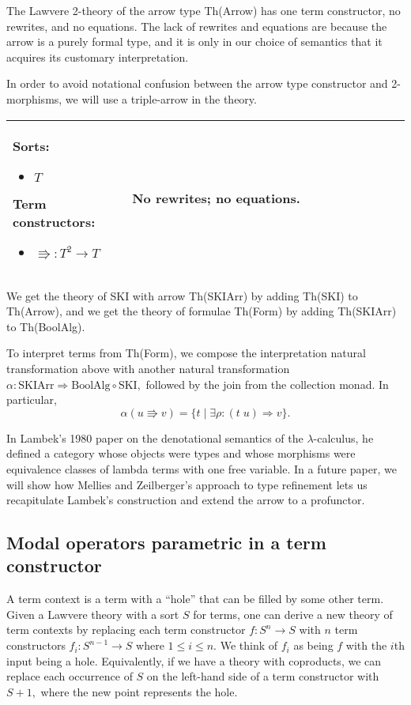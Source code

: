 \documentclass{llncs}
\newcommand{\maps}{\colon}
\begin{document}
The Lawvere 2-theory of the arrow type Th(Arrow) has one term constructor, no rewrites, and no equations.  The lack of rewrites and equations are because the arrow is a purely formal type, and it is only in our choice of semantics that it acquires its customary interpretation.

In order to avoid notational confusion between the arrow type constructor and 2-morphisms, we will use a triple-arrow in the theory.
\begin{center}
  \begin{longtable}{|p{0.3\linewidth}|p{0.7\linewidth}|}
    \hline
    Sorts:
    \begin{itemize}
      \item $T$
    \end{itemize}
    Term constructors:
    \begin{itemize}
      \item $\Rrightarrow \maps T^2 \to T$
    \end{itemize}
    &
    No rewrites; no equations.\\
    \hline
  \end{longtable}
\end{center}

We get the theory of SKI with arrow Th(SKIArr) by adding Th(SKI) to Th(Arrow), and we get the theory of formulae Th(Form) by adding Th(SKIArr) to Th(BoolAlg).

To interpret terms from Th(Form), we compose the interpretation natural transformation above with another natural transformation $\alpha\maps \mathrm{SKIArr} \Rightarrow \mathrm{BoolAlg} \circ \mathrm{SKI},$ followed by the join from the collection monad.  In particular, 
\[ \alpha(u \Rrightarrow v) = \{ t \;|\; \exists \rho\maps (t\; u) \Rightarrow v \}. \]

In Lambek's 1980 paper \cite{Lambek} on the denotational semantics of the $\lambda$-calculus, he defined a category whose objects were types and whose morphisms were equivalence classes of lambda terms with one free variable.  In a future paper, we will show how Mellies and Zeilberger's approach to type refinement lets us recapitulate Lambek's construction and extend the arrow to a profunctor.

\subsection{Modal operators parametric in a term constructor}

A term context is a term with a ``hole'' that can be filled by some other term.  Given a Lawvere theory with a sort $S$ for terms, one can derive a new theory of term contexts by replacing each term constructor $f\maps S^n \to S$ with $n$ term constructors $f_i\maps S^{n-1} \to S$ where $1 \le i \le n$.  We think of $f_i$ as being $f$ with the $i$th input being a hole.  Equivalently, if we have a theory with coproducts, we can replace each occurrence of $S$ on the left-hand side of a term constructor with $S+1,$ where the new point represents the hole.
\end{document}
